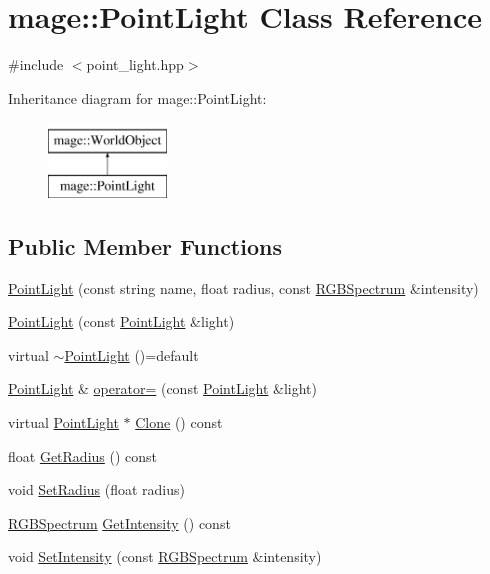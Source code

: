 \hypertarget{classmage_1_1_point_light}{}\section{mage\+:\+:Point\+Light Class Reference}
\label{classmage_1_1_point_light}


{\ttfamily \#include $<$point\+\_\+light.\+hpp$>$}

Inheritance diagram for mage\+:\+:Point\+Light\+:\begin{figure}[H]
\begin{center}
\leavevmode
\includegraphics[height=2.000000cm]{classmage_1_1_point_light}
\end{center}
\end{figure}
\subsection*{Public Member Functions}
\begin{DoxyCompactItemize}
\item 
\hyperlink{classmage_1_1_point_light_ac9d479055720799816d0489669cbd986}{Point\+Light} (const string name, float radius, const \hyperlink{structmage_1_1_r_g_b_spectrum}{R\+G\+B\+Spectrum} \&intensity)
\item 
\hyperlink{classmage_1_1_point_light_a0b0d5b110f1af47091ae682db7320c62}{Point\+Light} (const \hyperlink{classmage_1_1_point_light}{Point\+Light} \&light)
\item 
virtual \hyperlink{classmage_1_1_point_light_ae76fc13ca85717694d55d1a3bb195a98}{$\sim$\+Point\+Light} ()=default
\item 
\hyperlink{classmage_1_1_point_light}{Point\+Light} \& \hyperlink{classmage_1_1_point_light_ae194c7b6e032ddbbf110009348b08c33}{operator=} (const \hyperlink{classmage_1_1_point_light}{Point\+Light} \&light)
\item 
virtual \hyperlink{classmage_1_1_point_light}{Point\+Light} $\ast$ \hyperlink{classmage_1_1_point_light_a5a685d110af3ec491105147a15df7b87}{Clone} () const
\item 
float \hyperlink{classmage_1_1_point_light_a6321441e96d79caaacf40056beb288f2}{Get\+Radius} () const
\item 
void \hyperlink{classmage_1_1_point_light_ae7b4c301c148bd78348e26e5b6ad8faf}{Set\+Radius} (float radius)
\item 
\hyperlink{structmage_1_1_r_g_b_spectrum}{R\+G\+B\+Spectrum} \hyperlink{classmage_1_1_point_light_aee79741f59d9abebfdd77784c4b29381}{Get\+Intensity} () const
\item 
void \hyperlink{classmage_1_1_point_light_a40c0790159f687fd653a4792f8b39a21}{Set\+Intensity} (const \hyperlink{structmage_1_1_r_g_b_spectrum}{R\+G\+B\+Spectrum} \&intensity)
\end{DoxyCompactItemize}

